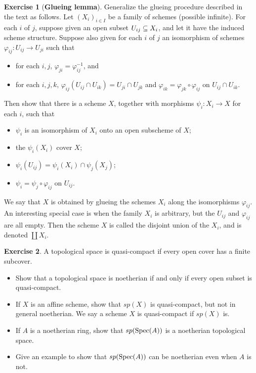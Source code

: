 \documentclass[11pt]{book}
\theoremstyle{definition}
\newtheorem{exercise}{Exercise}[section]
\begin{document}
\begin{exercise}[\textbf{Glueing lemma}]
Generalize the glueing procedure described in the text as follows. Let $(X_i)_{i\in I}$ be a family of schemes (possible infinite). For each $i$ of $j$, suppose given an open subset $U_{ij}\subseteq X_i$, and let it have the induced scheme structure. Suppose also given for each $i$ of $j$ an isomorphism of schemes $\varphi_{ij}:U_{ij}\to U_{ji}$ such that
\begin{itemize}
\item[(1)] for each $i,j$, $\varphi_{ji}=\varphi_{ij}^{-1}$, and
\item[(2)] for each $i,j,k$, $\varphi_{ij}(U_{ij}\cap U_{ik})=U_{ji}\cap U_{jk}$ and $\varphi_{ik}=\varphi_{jk}\circ\varphi_{ij}$ on $U_{ij}\cap U_{ik}$.
\end{itemize}
Then show that there is a scheme $X$, together with morphisms $\psi_i:X_i\to X$ for each $i$, such that 
\begin{itemize}
\item[(1)] $\psi_i$ is an isomorphism of $X_i$ onto an open subscheme of $X$; 
\item[(2)] the $\psi_i(X_i)$ cover $X$;
\item[(3)] $\psi_i(U_{ij})=\psi_i(X_i)\cap\psi_j(X_j)$;
\item[(4)] $\psi_i=\psi_j\circ\varphi_{ij}$ on $U_{ij}$.
\end{itemize}
We say that $X$ is obtained by glueing the schemes $X_i$ along the isomorphisms $\varphi_{ij}$. An interesting special case is when the family $X_i$ is arbitrary, but the $U_{ij}$ and $\varphi_{ij}$ are all empty. Then the scheme $X$ is called the disjoint union of the $X_i$, and is denoted $\coprod X_i$.
\end{exercise}
\begin{exercise}
A topological space is quasi-compact if every open cover has a finite subcover.
\begin{itemize}
\item[(a)] Show that a topological space is noetherian if and only if every open subset is quasi-compact.
\item[(b)] If $X$ is an affine scheme, show that $sp(X)$ is quasi-compact, but not in general noetherian. We say a scheme $X$ is quasi-compact if $sp(X)$ is.
\item[(c)] If $A$ is a noetherian ring, show that $sp(\mathrm{Spec}(A))$ is a noetherian topological space.
\item[(d)] Give an example to show that $sp(\mathrm{Spec}(A))$ can be noetherian even when $A$ is not.
\end{itemize}
\end{exercise}
\end{document}

